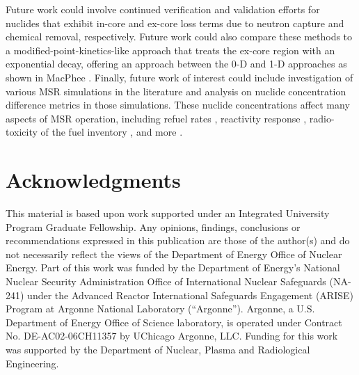 \documentclass{style/nseJournal}
\begin{document}
Future work could involve continued verification and validation efforts for nuclides that exhibit in-core and ex-core loss terms due to neutron capture and chemical removal, respectively.
Future work could also compare these methods to a modified-point-kinetics-like approach that treats the ex-core region with an exponential decay, offering an approach between the 0-D and 1-D approaches as shown in MacPhee \cite{macphee1958kinetics}.
Finally, future work of interest could include investigation of various MSR simulations in the literature and analysis on nuclide concentration difference metrics in those simulations.
These nuclide concentrations affect many aspects of MSR operation, including refuel rates \cite{ridley_method_2017, rykhlevskii_modeling_2019}, reactivity response \cite{aufiero_extended_2013}, radio-toxicity of the fuel inventory \cite{fiorina_preliminary_2012}, and more \cite{seifert2023analysis}.










\pagebreak
\section*{Acknowledgments}
This material is based upon work supported under an Integrated University Program Graduate
Fellowship.
Any opinions, findings, conclusions or recommendations expressed in this publication are
those of the author(s) and do not necessarily reflect the views of the Department of Energy
Office of Nuclear Energy.
Part of this work was funded by the Department of Energy’s National Nuclear Security Administration Office of International Nuclear Safeguards (NA-241) under the Advanced Reactor International Safeguards Engagement (ARISE) Program at Argonne National Laboratory (“Argonne”). Argonne, a U.S. Department of Energy Office of Science laboratory, is operated under Contract No. DE-AC02-06CH11357 by UChicago Argonne, LLC.
Funding for this work was supported by the Department of Nuclear, Plasma and Radiological Engineering.
\end{document}
